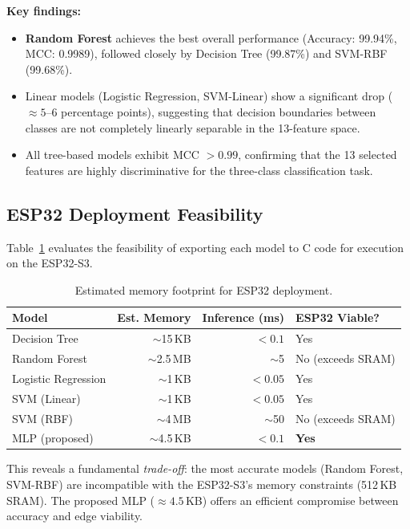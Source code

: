 \textbf{Key findings:}
\begin{itemize}
    \item \textbf{Random Forest} achieves the best overall performance (Accuracy: 99.94\%, MCC: 0.9989), followed closely by Decision Tree (99.87\%) and SVM-RBF (99.68\%).
    \item Linear models (Logistic Regression, SVM-Linear) show a significant drop ($\approx 5$--$6$ percentage points), suggesting that decision boundaries between classes are not completely linearly separable in the 13-feature space.
    \item All tree-based models exhibit MCC $> 0.99$, confirming that the 13 selected features are highly discriminative for the three-class classification task.
\end{itemize}

\subsection{ESP32 Deployment Feasibility}

Table~\ref{tab:classic_esp32} evaluates the feasibility of exporting each model to C code for execution on the ESP32-S3.

\begin{table}[H]
\centering
\caption{Estimated memory footprint for ESP32 deployment.}
\label{tab:classic_esp32}
\small
\begin{tabular}{l r r l}
\toprule
\textbf{Model} & \textbf{Est. Memory} & \textbf{Inference (ms)} & \textbf{ESP32 Viable?} \\
\midrule
Decision Tree       & $\sim$15\,KB  & $< 0.1$ & Yes \\
Random Forest       & $\sim$2.5\,MB & $\sim$5  & No (exceeds SRAM) \\
Logistic Regression & $\sim$1\,KB   & $< 0.05$ & Yes \\
SVM (Linear)        & $\sim$1\,KB   & $< 0.05$ & Yes \\
SVM (RBF)           & $\sim$4\,MB   & $\sim$50 & No (exceeds SRAM) \\
MLP (proposed)      & $\sim$4.5\,KB & $< 0.1$  & \textbf{Yes} \\
\bottomrule
\end{tabular}
\end{table}

This reveals a fundamental \emph{trade-off}: the most accurate models (Random Forest, SVM-RBF) are incompatible with the ESP32-S3's memory constraints (512\,KB SRAM). The proposed MLP ($\approx 4.5$\,KB) offers an efficient compromise between accuracy and edge viability.

